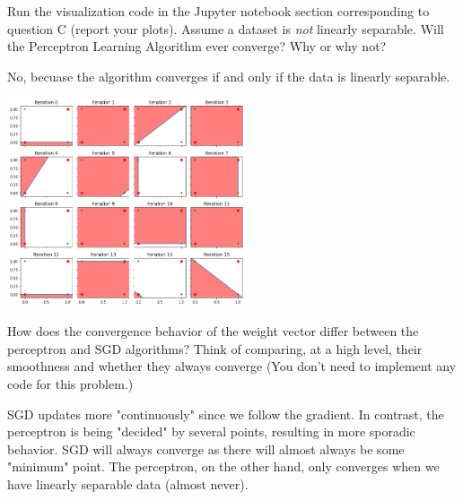 \begin{problem}[2]
  Run the visualization code in the Jupyter notebook section corresponding to question C (report your plots). Assume a dataset is \emph{not} linearly separable. Will the Perceptron Learning Algorithm ever converge? Why or why not?
\end{problem}
\begin{solution}
    No, becuase the algorithm converges if and only if the data is linearly separable.

    \begin{center}
        \includegraphics[width=7cm]{set1/images/bruh.png}
    \end{center}
\end{solution}

\begin{problem}[2]
How does the convergence behavior of the weight vector differ between the perceptron and SGD algorithms? Think of comparing, at a high level, their smoothness and whether they always converge (You don't need to implement any code for this problem.)
\end{problem}
\begin{solution}
SGD updates more "continuously" since we follow the gradient. In contrast, the perceptron is being "decided" by several points, resulting in more sporadic behavior. SGD will always converge as there will almost always be some "minimum" point. The perceptron, on the other hand, only converges when we have linearly separable data (almost never).
\end{solution}
